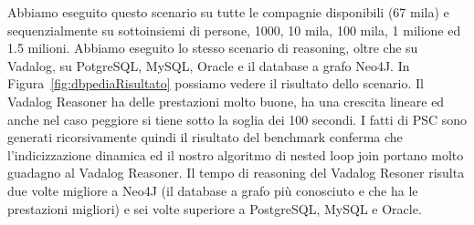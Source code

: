 Abbiamo eseguito questo scenario su tutte le compagnie disponibili (67 mila) e sequenzialmente su sottoinsiemi di persone, 1000, 10 mila, 100 mila, 1 milione ed 1.5 milioni. Abbiamo eseguito lo stesso scenario di reasoning, oltre che su Vadalog, su PotgreSQL, MySQL, Oracle e il database a grafo Neo4J. \newline
In Figura~\ref{fig:dbpediaRisultato} possiamo vedere il risultato dello scenario. Il Vadalog Reasoner ha delle prestazioni molto buone, ha una crescita lineare ed anche nel caso peggiore si tiene sotto la soglia dei 100 secondi. I fatti di PSC sono generati ricorsivamente quindi il risultato del benchmark conferma che l'indicizzazione dinamica ed il nostro algoritmo di nested loop join portano molto guadagno al Vadalog Reasoner. \newline
Il tempo di reasoning del Vadalog Resoner risulta due volte migliore a Neo4J (il database a grafo più conosciuto e che ha le prestazioni migliori) e sei volte superiore a PostgreSQL, MySQL e Oracle.